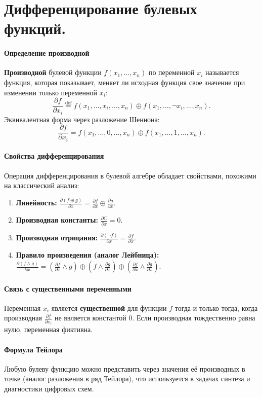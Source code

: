 \section{Дифференцирование булевых функций.}

\paragraph{Определение производной}
\textbf{Производной} булевой функции $f(x_1, \dots, x_n)$ по переменной $x_i$ называется функция, которая показывает, меняет ли исходная функция свое значение при изменении только переменной $x_i$:
$$\frac{\partial f}{\partial x_i} \stackrel{\text{def}}{=} f(x_1, \dots, x_i, \dots, x_n) \oplus f(x_1, \dots, \neg x_i, \dots, x_n).$$
Эквивалентная форма через разложение Шеннона:
$$\frac{\partial f}{\partial x_i} = f(x_1, \dots, 0, \dots, x_n) \oplus f(x_1, \dots, 1, \dots, x_n).$$

\paragraph{Свойства дифференцирования}
Операция дифференцирования в булевой алгебре обладает свойствами, похожими на классический анализ:
\begin{enumerate}
    \item \textbf{Линейность:} $\frac{\partial (f \oplus g)}{\partial x} = \frac{\partial f}{\partial x} \oplus \frac{\partial g}{\partial x}$.
    \item \textbf{Производная константы:} $\frac{\partial C}{\partial x} = 0$.
    \item \textbf{Производная отрицания:} $\frac{\partial (\neg f)}{\partial x} = \frac{\partial f}{\partial x}$.
    \item \textbf{Правило произведения (аналог Лейбница):} 
    $\frac{\partial (f \land g)}{\partial x} = \left( \frac{\partial f}{\partial x} \land g \right) \oplus \left( f \land \frac{\partial g}{\partial x} \right) \oplus \left( \frac{\partial f}{\partial x} \land \frac{\partial g}{\partial x} \right)$.
\end{enumerate}

\paragraph{Связь с существенными переменными}
Переменная $x_i$ является \textbf{существенной} для функции $f$ тогда и только тогда, когда производная $\frac{\partial f}{\partial x_i}$ не является константой $0$. Если производная тождественно равна нулю, переменная фиктивна.

\paragraph{Формула Тейлора}
Любую булеву функцию можно представить через значения её производных в точке (аналог разложения в ряд Тейлора), что используется в задачах синтеза и диагностики цифровых схем.